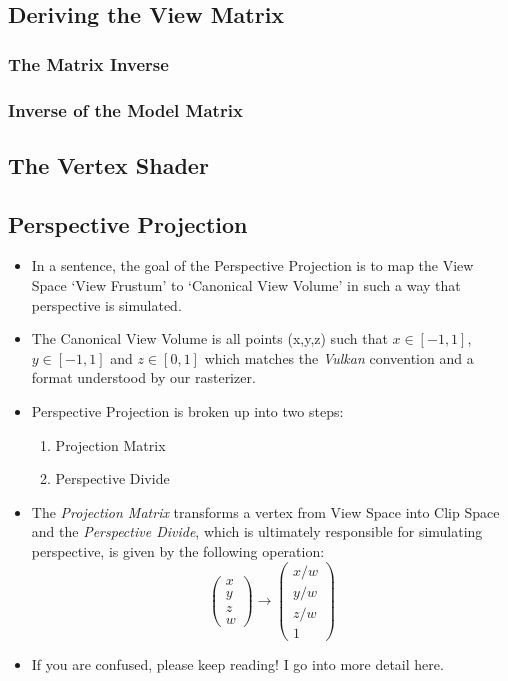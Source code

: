 \documentclass{article}
\begin{document}
\subsection{Deriving the View Matrix}
\subsubsection{The Matrix Inverse}
\subsubsection{Inverse of the Model Matrix}

\subsection{The Vertex Shader}
\subsection{Perspective Projection}
\begin{itemize}
\item In a sentence, the goal of the Perspective Projection is to map the View Space `View Frustum' to `Canonical View Volume' in such a way that perspective is simulated.

\item The Canonical View Volume is all points (x,y,z) such that $x \in [-1,1]$, $y \in [-1,1]$ and $z \in [0,1]$ which matches the \textit{Vulkan} convention and a format understood by our rasterizer.

\item Perspective Projection is broken up into two steps:
\begin{enumerate}
\item Projection Matrix
\item Perspective Divide
\end{enumerate}

\item The \textit{Projection Matrix} transforms a vertex from View Space into Clip Space and the \textit{Perspective Divide}, which is ultimately responsible for simulating perspective, is given by the following operation: 
\[
	\begin{pmatrix}
		x\\
		y\\
		z\\
		w
	\end{pmatrix}
	\rightarrow
	\begin{pmatrix}
		x/w\\
		y/w\\
		z/w\\
		1
	\end{pmatrix}
\]

\item If you are confused, please keep reading! I go into more detail here.
\end{itemize}
\end{document}

